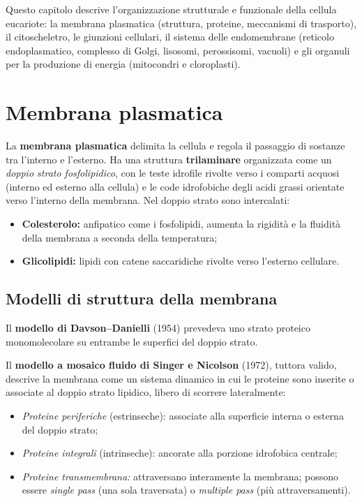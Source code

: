 \documentclass[11pt,a4paper,openright,twoside]{book}
\theoremstyle{definition}
\theoremstyle{plain}
\theoremstyle{remark}
\begin{document}
\begin{tcolorbox}[summarybox, title={Sommario del capitolo}]
Questo capitolo descrive l'organizzazione strutturale e funzionale della cellula eucariote: la membrana plasmatica (struttura, proteine, meccanismi di trasporto), il citoscheletro, le giunzioni cellulari, il sistema delle endomembrane (reticolo endoplasmatico, complesso di Golgi, lisosomi, perossisomi, vacuoli) e gli organuli per la produzione di energia (mitocondri e cloroplasti).
\end{tcolorbox}

\section{Membrana plasmatica}

La \textbf{membrana plasmatica} delimita la cellula e regola il passaggio di sostanze tra l'interno e l'esterno. Ha una struttura \textbf{trilaminare} organizzata come un \textit{doppio strato fosfolipidico}, con le teste idrofile rivolte verso i comparti acquosi (interno ed esterno alla cellula) e le code idrofobiche degli acidi grassi orientate verso l'interno della membrana. Nel doppio strato sono intercalati:
\begin{itemize}
  \item \textbf{Colesterolo:} anfipatico come i fosfolipidi, aumenta la rigidità e la fluidità della membrana a seconda della temperatura;
  \item \textbf{Glicolipidi:} lipidi con catene saccaridiche rivolte verso l'esterno cellulare.
\end{itemize}

\subsection{Modelli di struttura della membrana}

Il \textbf{modello di Davson--Danielli} (1954) prevedeva uno strato proteico monomolecolare su entrambe le superfici del doppio strato.

Il \textbf{modello a mosaico fluido di Singer e Nicolson} (1972), tuttora valido, descrive la membrana come un sistema dinamico in cui le proteine sono inserite o associate al doppio strato lipidico, libero di scorrere lateralmente:
\begin{itemize}
  \item \textit{Proteine periferiche} (estrinseche): associate alla superficie interna o esterna del doppio strato;
  \item \textit{Proteine integrali} (intrinseche): ancorate alla porzione idrofobica centrale;
  \item \textit{Proteine transmembrana:} attraversano interamente la membrana; possono essere \textit{single pass} (una sola traversata) o \textit{multiple pass} (più attraversamenti).
\end{itemize}
\end{document}
